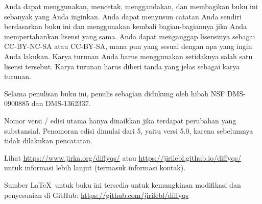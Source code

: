 \documentclass[12pt]{book}
\begin{document}
\begin{small}
\bigskip

\noindent
Anda dapat menggunakan, mencetak, menggandakan, dan membagikan buku ini sebanyak yang Anda inginkan.  Anda dapat
menyusun catatan Anda sendiri berdasarkan buku ini dan menggunakan kembali bagian-bagiannya jika Anda mempertahankan lisensi yang
sama.  Anda dapat menganggap lisensinya sebagai CC-BY-NC-SA atau CC-BY-SA\@,
mana pun yang sesuai dengan apa yang ingin Anda lakukan.
Karya turunan Anda harus menggunakan setidaknya salah satu lisensi tersebut.
Karya turunan harus diberi tanda yang jelas sebagai karya turunan.


\bigskip

\noindent
Selama penulisan buku ini, 
penulis sebagian didukung oleh hibah NSF DMS-0900885 dan
DMS-1362337.

\bigskip

\noindent
Nomor versi / edisi utama
hanya dinaikkan jika terdapat perubahan yang substansial.
Penomoran edisi
dimulai dari 5, yaitu versi 5.0, karena sebelumnya tidak dilakukan
pencatatan.

\bigskip

\noindent
Lihat
\url{https://www.jirka.org/diffyqs/}
atau
\url{https://jirilebl.github.io/diffyqs/}
untuk informasi lebih lanjut
(termasuk informasi kontak).


\bigskip

\noindent
Sumber \LaTeX\ untuk buku ini tersedia
untuk kemungkinan modifikasi dan penyesuaian
di GitHub: \url{https://github.com/jirilebl/diffyqs}


\end{small}

\diffytableofcontents

\newpage
\end{document}
